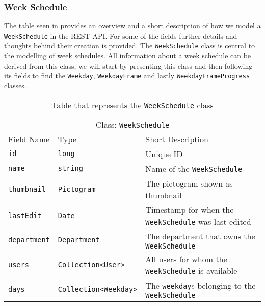 \subsubsection{Week Schedule}
The table seen in  provides an overview and a short description of how we model a \texttt{WeekSchedule} in the REST API.
For some of the fields further details and thoughts behind their creation is provided.
The \texttt{WeekSchedule} class is central to the modelling of week schedules.
All information about a week schedule can be derived from this class, we will start by presenting this class and then following its fields to find the \texttt{Weekday}, \texttt{WeekdayFrame} and lastly \texttt{WeekdayFrameProgress} classes.

\begin{table}[]
\centering
\caption{Table that represents the \texttt{WeekSchedule} class}
\label{tbl:WeekSchedule}
\begin{tabular}{lll}
\multicolumn{3}{c}{Class: \texttt{WeekSchedule}}                                                                                        \\
Field Name          & Type                                             & Short Description                                              \\
\texttt{id}         & \texttt{long}                                    & Unique ID                                                      \\
\texttt{name}       & \texttt{string}                                  & Name of the \texttt{WeekSchedule}                              \\
\texttt{thumbnail}  & \texttt{Pictogram}                               & The pictogram shown as thumbnail                               \\
\texttt{lastEdit}   & \texttt{Date}                                    & Timestamp for when the \texttt{WeekSchedule} was last edited   \\
\texttt{department} & \texttt{Department}                              & The department that owns the \texttt{WeekSchedule}             \\
\texttt{users}      & \texttt{Collection\textless User\textgreater}    & All users for whom the \texttt{WeekSchedule} is available      \\
\texttt{days}       & \texttt{Collection\textless Weekday\textgreater} & The \texttt{weekday}s belonging to the \texttt{WeekSchedule}           
\end{tabular}
\end{table}


